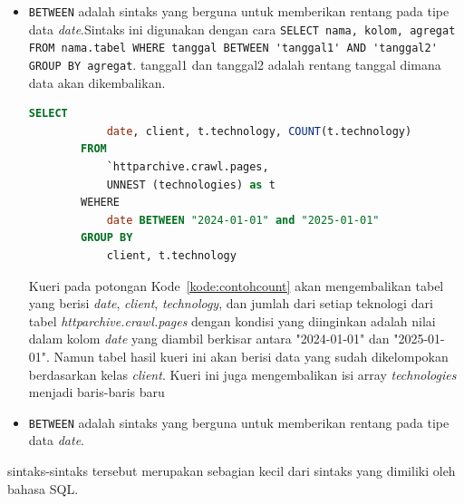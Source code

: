 \begin{itemize}
    \item \verb|BETWEEN| adalah sintaks yang berguna untuk memberikan rentang pada tipe data \textit{date}.Sintaks ini digunakan dengan cara \verb|SELECT nama, kolom, agregat FROM nama.tabel WHERE tanggal BETWEEN 'tanggal1' AND 'tanggal2' GROUP BY agregat|. tanggal1 dan tanggal2 adalah rentang tanggal dimana data akan dikembalikan.
    \begin{lstlisting}[language=SQL, caption=contoh penggunaan sintaks \lstinline|BETWEEN|, label=kode:contohbetween]
        SELECT
            date, client, t.technology, COUNT(t.technology)
        FROM
            `httparchive.crawl.pages,
            UNNEST (technologies) as t
        WEHERE
            date BETWEEN "2024-01-01" and "2025-01-01"
        GROUP BY
            client, t.technology
    \end{lstlisting}
    Kueri pada potongan Kode~\ref{kode:contohcount} akan mengembalikan tabel yang berisi \textit{date}, \textit{client}, \textit{technology}, dan jumlah dari setiap teknologi dari tabel \textit{httparchive.crawl.pages} dengan kondisi yang diinginkan adalah nilai dalam kolom \textit{date} yang diambil berkisar antara "2024-01-01" dan "2025-01-01". Namun tabel hasil kueri ini akan berisi data yang sudah dikelompokan berdasarkan kelas \textit{client}. Kueri ini juga mengembalikan isi array \textit{technologies} menjadi baris-baris baru
    \item \verb|BETWEEN| adalah sintaks yang berguna untuk memberikan rentang pada tipe data \textit{date}.
\end{itemize}
sintaks-sintaks tersebut merupakan sebagian kecil dari sintaks yang dimiliki oleh bahasa SQL.



